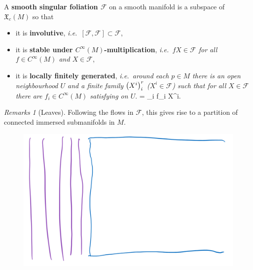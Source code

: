\documentclass[hyperref={pdfpagelabels=false}]{beamer}
\def\bas#1\eas{\begin{align*}#1\end{align*}}
\theoremstyle{plain}
\theoremstyle{remark}
\newtheorem*{remark}{Remarks}
\begin{document}
\begin{frame}
\begin{definition}
A \textbf{smooth singular foliation $\mathcal{F}$} on a smooth manifold is a subspace of $\mathfrak{X}_c(M)$ so that
\begin{itemize}
	\item it is \textbf{involutive}, \textit{i.e.\ $[\mathcal{F}, \mathcal{F}] \subset \mathcal{F}$},
	\item it is \textbf{stable under $C^\infty(M)$-multiplication}, \textit{i.e.\ $fX \in \mathcal{F}$ for all $f \in C^\infty(M)$ and $X \in \mathcal{F}$},
	\item it is \textbf{locally finitely generated}, \textit{i.e.\ around each $p \in M$ there is an open neighbourhood $U$ and a finite family $\mleft( X^i \mright)_i^{r}$ ($X^i \in \mathcal{F}$) such that for all $X \in \mathcal{F}$ there are $f_i \in C^\infty(M)$ satisfying on $U$}.
	\bas
	X = \sum_i f_i X^i.
	\eas
\end{itemize}
\end{definition}
\end{frame}

\begin{frame}
\begin{remark}[Leaves]
Following the flows in $\mathcal{F}$, this gives rise to a partition of connected immersed submanifolds in $M$.
\end{remark}

\begin{figure}[htbp]
	\centering
		\includegraphics[width=.70\textwidth]{Foliation example.png}
	\label{fig:Foliation example}
\end{figure}


\end{frame}
\end{document}
